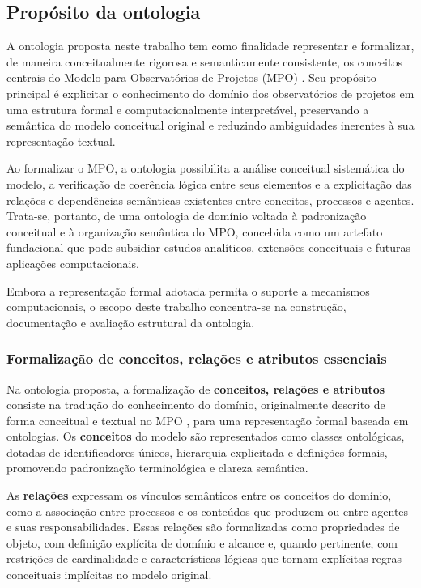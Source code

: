 \subsection{Propósito da ontologia}
A ontologia proposta neste trabalho tem como finalidade representar e formalizar, de maneira conceitualmente rigorosa e semanticamente consistente, os conceitos centrais do Modelo para Observatórios de Projetos (MPO) \cite{vieira2022thesis}. Seu propósito principal é explicitar o conhecimento do domínio dos observatórios de projetos em uma estrutura formal e computacionalmente interpretável, preservando a semântica do modelo conceitual original e reduzindo ambiguidades inerentes à sua representação textual.

Ao formalizar o MPO, a ontologia possibilita a análise conceitual sistemática do modelo, a verificação de coerência lógica entre seus elementos e a explicitação das relações e dependências semânticas existentes entre conceitos, processos e agentes. Trata-se, portanto, de uma ontologia de domínio voltada à padronização conceitual e à organização semântica do MPO, concebida como um artefato fundacional que pode subsidiar estudos analíticos, extensões conceituais e futuras aplicações computacionais.

Embora a representação formal adotada permita o suporte a mecanismos computacionais, o escopo deste trabalho concentra-se na construção, documentação e avaliação estrutural da ontologia.

\subsubsection{Formalização de conceitos, relações e atributos essenciais}
Na ontologia proposta, a formalização de \textbf{conceitos, relações e atributos} consiste na tradução do conhecimento do domínio, originalmente descrito de forma conceitual e textual no MPO \cite{vieira2022thesis}, para uma representação formal baseada em ontologias. Os \textbf{conceitos} do modelo são representados como classes ontológicas, dotadas de identificadores únicos, hierarquia explicitada e definições formais, promovendo padronização terminológica e clareza semântica.

As \textbf{relações} expressam os vínculos semânticos entre os conceitos do domínio, como a associação entre processos e os conteúdos que produzem ou entre agentes e suas responsabilidades. Essas relações são formalizadas como propriedades de objeto, com definição explícita de domínio e alcance e, quando pertinente, com restrições de cardinalidade e características lógicas que tornam explícitas regras conceituais implícitas no modelo original.

